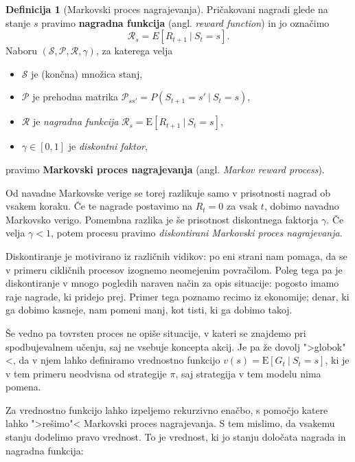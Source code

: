 \documentclass[12pt,a4paper]{amsart}
\theoremstyle{definition} %
\newtheorem{definicija}{Definicija}[section]
\theoremstyle{plain} %
\begin{document}
\begin{definicija}[Markovski proces nagrajevanja]
    Pričakovani nagradi glede na stanje $s$ pravimo \textbf{nagradna funkcija} (angl. \textit{reward 
    function}) in jo označimo
    $$
    \mathcal{R}_s = E[R_{t+1}~|~S_{t} = s].
    $$
    Naboru $(\mathcal{S}, \mathcal{P}, \mathcal{R}, \gamma)$, za katerega velja
    \begin{itemize}
        \item $\mathcal{S}$ je (končna) množica stanj,
        \item $\mathcal{P}$ je prehodna matrika $\mathcal{P}_{ss'} = P(S_{t+1} = s'~|~S_{t} = s)$, 
        \item $\mathcal{R}$ je \textit{nagradna funkcija} 
                $\mathcal{R}_s = \mathrm{E}[R_{t+1}~|~S_{t} = s]$, 
        \item $\gamma \in [0,1]$ je \textit{diskontni faktor}, 
    \end{itemize}
    pravimo \textbf{Markovski proces nagrajevanja} (angl. \textit{Markov reward process}).
\end{definicija}

Od navadne Markovske verige se torej razlikuje samo v prisotnosti nagrad ob vsakem koraku. Če te 
nagrade postavimo na $R_t = 0$ za vsak $t$, dobimo navadno Markovsko verigo. Pomembna razlika je še 
prisotnost diskontnega faktorja $\gamma$. Če velja $\gamma < 1$, potem procesu pravimo \textit{
diskontirani Markovski proces nagrajevanja}.

Diskontiranje je motivirano iz različnih vidikov: po eni strani nam pomaga, da se v primeru 
cikličnih procesov izognemo neomejenim povračilom. Poleg tega pa je diskontiranje v mnogo pogledih 
naraven način za opis situacije: pogosto imamo raje nagrade, ki pridejo prej. Primer tega poznamo 
recimo iz ekonomije; denar, ki ga dobimo kasneje, nam pomeni manj, kot tisti, ki ga dobimo takoj. 

Še vedno pa tovrsten proces ne opiše situacije, v kateri se znajdemo pri spodbujevalnem učenju, saj 
ne vsebuje koncepta akcij. Je pa že dovolj ">globok"<, da v njem lahko definiramo vrednostno 
funkcijo $v(s) = \mathrm{E} [G_t~|~S_t = s]$, ki je v tem primeru neodvisna od strategije $\pi$, 
saj strategija v tem modelu nima pomena. 

Za vrednostno funkcijo lahko izpeljemo rekurzivno enačbo, s pomočjo katere lahko ">rešimo"< Markovski
proces nagrajevanja. S tem mislimo, da vsakemu stanju dodelimo pravo vrednost. To je vrednost, ki jo 
stanju določata nagrada in nagradna funkcija:
\end{document}
